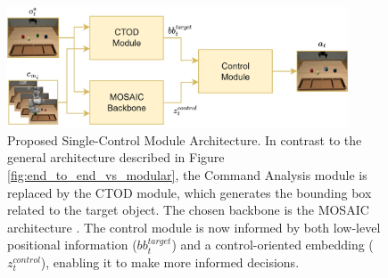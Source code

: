\begin{figure}[t]
    \centering
    \includegraphics[width=0.9\textwidth]{figures/images/ch3/single_control_module.jpg}
    \caption{Proposed Single-Control Module Architecture. In contrast to the general architecture described in Figure \ref{fig:end_to_end_vs_modular}, the Command Analysis module is replaced by the CTOD module, which generates the bounding box related to the target object. The chosen backbone is the MOSAIC architecture \cite{mandi2022towards_more_generalizable_one_shot}. The control module is now informed by both low-level positional information ($bb^{target}_{t}$) and a control-oriented embedding ($z^{control}_{t}$), enabling it to make more informed decisions.}
    \label{fig:single_control_module}
\end{figure}
